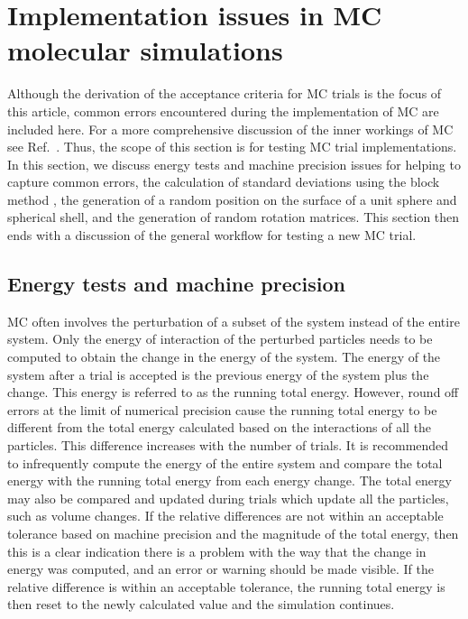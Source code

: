 \section{\label{sec:common_issues}Implementation issues in MC molecular simulations}

Although the derivation of the acceptance criteria for MC trials is the focus of this article, common errors encountered during the implementation of MC are included here.
For a more comprehensive discussion of the inner workings of MC see Ref.~\cite{dubbeldam_inner_2013}.
Thus, the scope of this section is for testing MC trial implementations.
In this section, we discuss energy tests and machine precision issues for helping to capture common errors, the calculation of standard deviations using the block method \cite{flyvbjerg_error_1989, grossfield_best_2018}, the generation of a random position on the surface of a unit sphere and spherical shell, and the generation of random rotation matrices.
This section then ends with a discussion of the general workflow for testing a new MC trial.

\subsection{\label{sec:energy_test}Energy tests and machine precision}

MC often involves the perturbation of a subset of the system instead of the entire system.
Only the energy of interaction of the perturbed particles needs to be computed to obtain the change in the energy of the system.
The energy of the system after a trial is accepted is the previous energy of the system plus the change.
This energy is referred to as the running total energy.
However, round off errors at the limit of numerical precision cause the running total energy to be different from the total energy calculated based on the interactions of all the particles.
This difference increases with the number of trials.
It is recommended to infrequently compute the energy of the entire system and compare the total energy with the running total energy from each energy change.
The total energy may also be compared and updated during trials which update all the particles, such as volume changes.
If the relative differences are not within an acceptable tolerance based on machine precision and the magnitude of the total energy, then this is a clear indication there is a problem with the way that the change in energy was computed, and an error or warning should be made visible.
If the relative difference is within an acceptable tolerance, the running total energy is then reset to the newly calculated value and the simulation continues.

